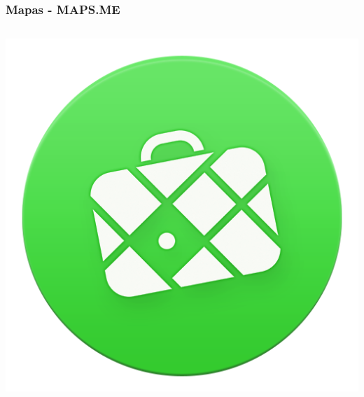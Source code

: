 \begin{frame}

    \frametitle{Mapas - MAPS.ME}

    \begin{columns}[c]
            \begin{center}
                \includegraphics[height=0.15\textheight]{images/mapsme-logo.png}

\end{center}
\end{columns}
\end{frame}
